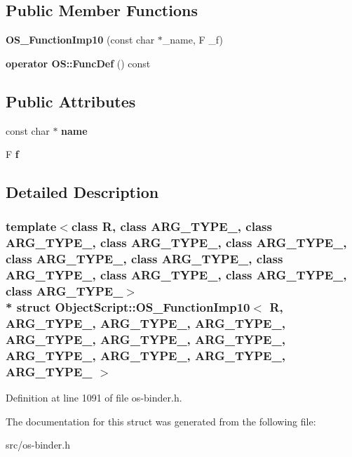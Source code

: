 \subsection*{Public Member Functions}
\begin{DoxyCompactItemize}
\item 
{\bfseries O\+S\+\_\+\+Function\+Imp10} (const char $\ast$\+\_\+name, F \+\_\+f)\hypertarget{struct_object_script_1_1_o_s___function_imp10_a6bdcb0dcaca0a25dff410bd24ad12133}{}\label{struct_object_script_1_1_o_s___function_imp10_a6bdcb0dcaca0a25dff410bd24ad12133}

\item 
{\bfseries operator O\+S\+::\+Func\+Def} () const \hypertarget{struct_object_script_1_1_o_s___function_imp10_a54cc8ffdeacf90f37fbc6580973fe4cd}{}\label{struct_object_script_1_1_o_s___function_imp10_a54cc8ffdeacf90f37fbc6580973fe4cd}

\end{DoxyCompactItemize}
\subsection*{Public Attributes}
\begin{DoxyCompactItemize}
\item 
const char $\ast$ {\bfseries name}\hypertarget{struct_object_script_1_1_o_s___function_imp10_ab7f80b51bf38afbea6bc5563ad1aee45}{}\label{struct_object_script_1_1_o_s___function_imp10_ab7f80b51bf38afbea6bc5563ad1aee45}

\item 
F {\bfseries f}\hypertarget{struct_object_script_1_1_o_s___function_imp10_ada393e0f64a050fc5afa77cf942b0f31}{}\label{struct_object_script_1_1_o_s___function_imp10_ada393e0f64a050fc5afa77cf942b0f31}

\end{DoxyCompactItemize}


\subsection{Detailed Description}
\subsubsection*{template$<$class R, class A\+R\+G\+\_\+\+T\+Y\+P\+E\+\_, class A\+R\+G\+\_\+\+T\+Y\+P\+E\+\_, class A\+R\+G\+\_\+\+T\+Y\+P\+E\+\_, class A\+R\+G\+\_\+\+T\+Y\+P\+E\+\_, class A\+R\+G\+\_\+\+T\+Y\+P\+E\+\_, class A\+R\+G\+\_\+\+T\+Y\+P\+E\+\_, class A\+R\+G\+\_\+\+T\+Y\+P\+E\+\_, class A\+R\+G\+\_\+\+T\+Y\+P\+E\+\_, class A\+R\+G\+\_\+\+T\+Y\+P\+E\+\_, class A\+R\+G\+\_\+\+T\+Y\+P\+E\+\_$>$\\*
struct Object\+Script\+::\+O\+S\+\_\+\+Function\+Imp10$<$ R, A\+R\+G\+\_\+\+T\+Y\+P\+E\+\_, A\+R\+G\+\_\+\+T\+Y\+P\+E\+\_, A\+R\+G\+\_\+\+T\+Y\+P\+E\+\_, A\+R\+G\+\_\+\+T\+Y\+P\+E\+\_, A\+R\+G\+\_\+\+T\+Y\+P\+E\+\_, A\+R\+G\+\_\+\+T\+Y\+P\+E\+\_, A\+R\+G\+\_\+\+T\+Y\+P\+E\+\_, A\+R\+G\+\_\+\+T\+Y\+P\+E\+\_, A\+R\+G\+\_\+\+T\+Y\+P\+E\+\_, A\+R\+G\+\_\+\+T\+Y\+P\+E\+\_ $>$}



Definition at line 1091 of file os-\/binder.\+h.



The documentation for this struct was generated from the following file\+:\begin{DoxyCompactItemize}
\item 
src/os-\/binder.\+h\end{DoxyCompactItemize}
